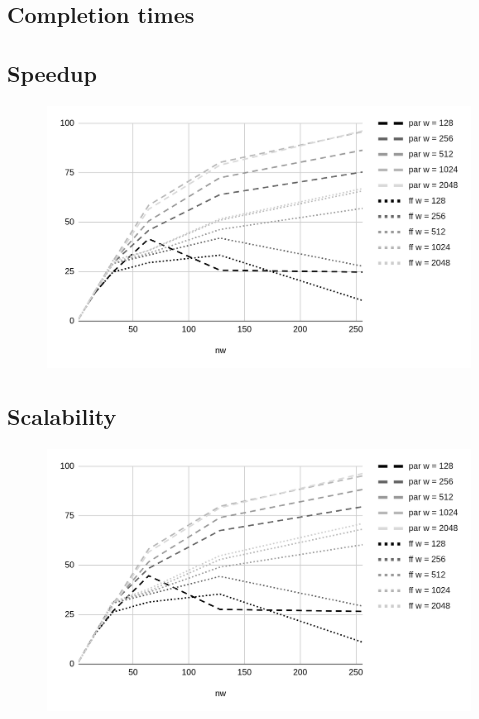 \subsection{Completion times}
\begin{table}[H]
    \centering
    
    \bigskip
\end{table}



\subsection{Speedup}
\begin{figure}[H]
    \centering
    \includegraphics[width=\linewidth]{assets/speedup}
    \bigskip
\end{figure}



\subsection{Scalability}
\begin{figure}[H]
    \centering
    \includegraphics[width=\linewidth]{assets/scalability}
    \bigskip
\end{figure}



